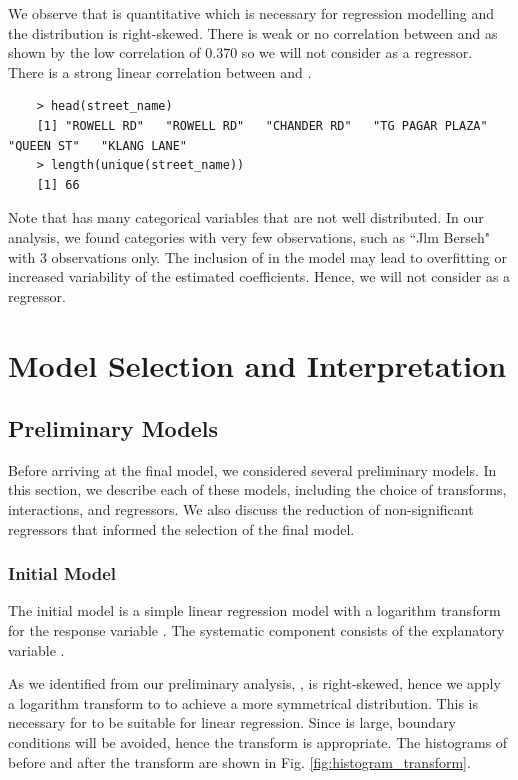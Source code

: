 We observe that  is quantitative which is necessary for regression modelling and the distribution is right-skewed. There is weak or no correlation between  and  as shown by the low correlation of 0.370 so we will not consider as a regressor. There is a strong linear correlation between  and .
\begin{verbatim}
    > head(street_name)
    [1] "ROWELL RD"   "ROWELL RD"   "CHANDER RD"   "TG PAGAR PLAZA"   "QUEEN ST"   "KLANG LANE"
    > length(unique(street_name))
    [1] 66
\end{verbatim}

Note that  has many categorical variables that are not well distributed. In our analysis, we found categories with very few observations, such as ``Jlm Berseh" with 3 observations only. The inclusion of  in the model may lead to overfitting or increased variability of the estimated coefficients. Hence, we will not consider  as a regressor.

\section{Model Selection and Interpretation}

\subsection{Preliminary Models}
Before arriving at the final model, we considered several preliminary models. In this section, we describe each of these models, including the choice of transforms, interactions, and regressors. We also discuss the reduction of non-significant regressors that informed the selection of the final model.

\subsubsection{Initial Model}
The initial model is a simple linear regression model with a logarithm transform for the response variable . The systematic component consists of the explanatory variable .

As we identified from our preliminary analysis, , is right-skewed, hence we apply a logarithm transform to  to achieve a more symmetrical distribution. This is necessary for  to be suitable for linear regression. Since  is large, boundary conditions will be avoided, hence the transform is appropriate. The histograms of  before and after the transform are shown in Fig. \ref{fig:histogram_transform}.


